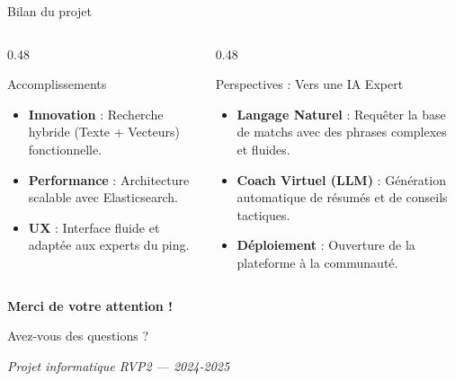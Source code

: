 \documentclass[aspectratio=169, 11pt]{beamer}
\begin{document}
\begin{frame}{Bilan du projet}
    \begin{columns}[T,onlytextwidth]
        \begin{column}{0.48\textwidth}
            \begin{block}{Accomplissements}
                \begin{itemize}\small
                    \item \textbf{Innovation} : Recherche hybride (Texte + Vecteurs) fonctionnelle.
                    \item \textbf{Performance} : Architecture scalable avec Elasticsearch.
                    \item \textbf{UX} : Interface fluide et adaptée aux experts du ping.
                \end{itemize}
            \end{block}
        \end{column}
        \begin{column}{0.48\textwidth}
            \begin{block}{Perspectives : Vers une IA Expert}
                \begin{itemize}\small
                    \item \textbf{Langage Naturel} : Requêter la base de matchs avec des phrases complexes et fluides.
                    \item \textbf{Coach Virtuel (LLM)} : Génération automatique de résumés et de conseils tactiques.
                    \item \textbf{Déploiement} : Ouverture de la plateforme à la communauté.
                \end{itemize}
            \end{block}
        \end{column}
    \end{columns}
\end{frame}

\begin{frame}[plain]
    \centering
    \vspace{1.5cm}
    
    {\Huge \textbf{Merci de votre attention !}}
    
    \vspace{1cm}
    
    {\Large Avez-vous des questions ?}
    
    \vspace{2cm}
    
    \small
    \textit{Projet informatique RVP2 — 2024-2025}
\end{frame}
\end{document}
